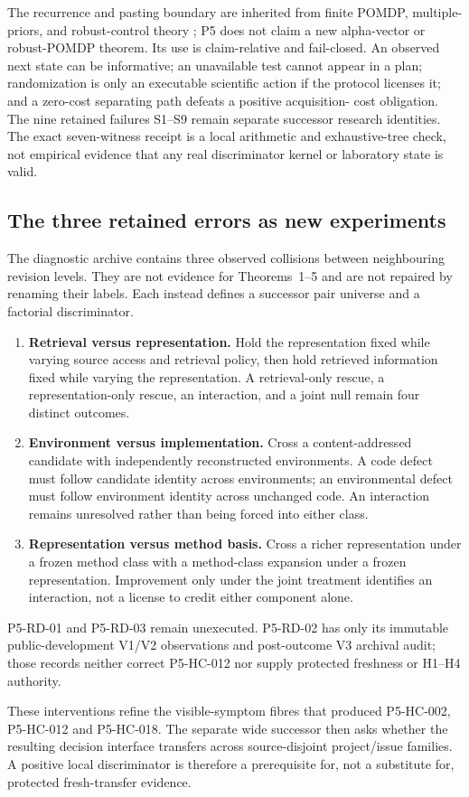 The recurrence and pasting boundary are inherited from finite POMDP,
multiple-priors, and robust-control theory
\cite{smallwood1973,iyengar2005,nakao2021}; P5 does not claim a new alpha-vector
or robust-POMDP theorem.  Its use is claim-relative and fail-closed.  An
observed next state can be informative; an unavailable test cannot appear in a
plan; randomization is only an executable scientific action if the protocol
licenses it; and a zero-cost separating path defeats a positive acquisition-
cost obligation.  The nine retained failures S1--S9 remain separate successor
research identities.  The exact seven-witness receipt is a local arithmetic
and exhaustive-tree check, not empirical evidence that any real discriminator
kernel or laboratory state is valid.

\subsection{The three retained errors as new experiments}

The diagnostic archive contains three observed collisions between neighbouring
revision levels. They are not evidence for Theorems~1--5 and are not repaired
by renaming their labels. Each instead defines a successor pair universe and a
factorial discriminator.

\begin{enumerate}
  \item \textbf{Retrieval versus representation.} Hold the representation
  fixed while varying source access and retrieval policy, then hold retrieved
  information fixed while varying the representation. A retrieval-only rescue,
  a representation-only rescue, an interaction, and a joint null remain four
  distinct outcomes.
  \item \textbf{Environment versus implementation.} Cross a content-addressed
  candidate with independently reconstructed environments. A code defect must
  follow candidate identity across environments; an environmental defect must
  follow environment identity across unchanged code. An interaction remains
  unresolved rather than being forced into either class.
  \item \textbf{Representation versus method basis.} Cross a richer
  representation under a frozen method class with a method-class expansion
  under a frozen representation. Improvement only under the joint treatment
  identifies an interaction, not a license to credit either component alone.
\end{enumerate}

P5-RD-01 and P5-RD-03 remain unexecuted. P5-RD-02 has only its immutable
public-development V1/V2 observations and post-outcome V3 archival audit; those
records neither correct P5-HC-012 nor supply protected freshness or H1--H4
authority.

These interventions refine the visible-symptom fibres that produced
P5-HC-002, P5-HC-012 and P5-HC-018. The separate wide successor then asks
whether the resulting decision interface transfers across source-disjoint
project/issue families. A positive local discriminator is therefore a
prerequisite for, not a substitute for, protected fresh-transfer evidence.
